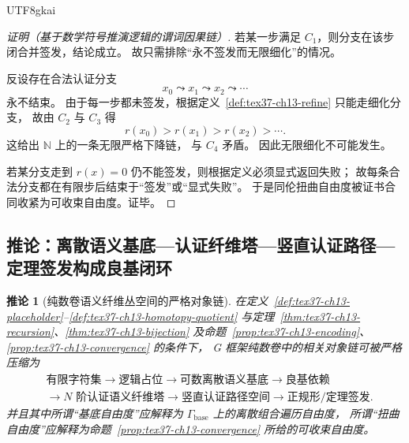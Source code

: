 \documentclass[12pt]{article}
\newtheorem{corollary}{推论}[section]
\newcommand{\NN}{\mathbb{N}}
\begin{document}
\begin{CJK*}{UTF8}{gkai}
\begin{proof}[证明（基于数学符号推演逻辑的谓词因果链）]
若某一步满足 $C_1$，则分支在该步闭合并签发，结论成立。
故只需排除“永不签发而无限细化”的情况。

反设存在合法认证分支
\[
  x_0\leadsto x_1\leadsto x_2\leadsto \cdots
\]
永不结束。
由于每一步都未签发，根据定义~\ref{def:tex37-ch13-refine} 只能走细化分支，
故由 $C_2$ 与 $C_3$ 得
\[
  r(x_0)>r(x_1)>r(x_2)>\cdots .
\]
这给出 $\NN$ 上的一条无限严格下降链，
与 $C_4$ 矛盾。
因此无限细化不可能发生。

若某分支走到 $r(x)=0$ 仍不能签发，则根据定义必须显式返回失败；
故每条合法分支都在有限步后结束于“签发”或“显式失败”。
于是同伦扭曲自由度被证书合同收紧为可收束自由度。证毕。
\end{proof}

\subsection{推论：离散语义基底—认证纤维塔—竖直认证路径—定理签发构成良基闭环}
\label{subsec:tex37-ch13-corollary}

\begin{corollary}[纯数卷语义纤维丛空间的严格对象链]
\label{cor:tex37-ch13-chain}
在定义~\ref{def:tex37-ch13-placeholder}--\ref{def:tex37-ch13-homotopy-quotient} 与定理~\ref{thm:tex37-ch13-recursion}、\ref{thm:tex37-ch13-bijection} 及命题~\ref{prop:tex37-ch13-encoding}、\ref{prop:tex37-ch13-convergence} 的条件下，
G 框架纯数卷中的相关对象链可被严格压缩为
\[
  \boxed{
    \begin{aligned}
      &\text{有限字符集}
      \to
      \text{逻辑占位}
      \to
      \text{可数离散语义基底}
      \to
      \text{良基依赖}\\
      &\to
      \text{$N$ 阶认证语义纤维塔}
      \to
      \text{竖直认证路径空间}
      \to
      \text{正规形/定理签发}.
    \end{aligned}
  }
\]
并且其中所谓“基底自由度”应解释为 $\Gamma_{\mathrm{base}}$ 上的离散组合遍历自由度，
所谓“扭曲自由度”应解释为命题~\ref{prop:tex37-ch13-convergence} 所给的可收束自由度。
\end{corollary}


\end{CJK*}
\end{document}
